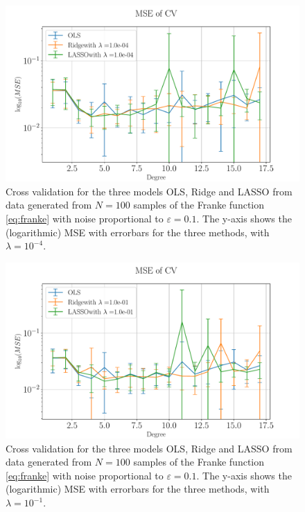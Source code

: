 \documentclass[%
reprint,
amsmath,amssymb,
aps,
pra,
]{revtex4-2}
\begin{document}
\begin{figure}[ht!]
	\centering
	\includegraphics[width=\linewidth]{Python/Figures/CV/CV_2_no_scaling.pdf}
	\caption{Cross validation for the three models OLS, Ridge and LASSO from data generated from \(N=100\) samples of the Franke function \eqref{eq:franke} with noise proportional to \(\varepsilon=0.1\). The y-axis shows the (logarithmic) MSE with errorbars for the three methods, with \(\lambda=10^{-4}\). }
	\label{fig:CV_2}
\end{figure}
\begin{figure}[ht!]
	\centering
	\includegraphics[width=\linewidth]{Python/Figures/CV/CV_3_no_scaling.pdf}
	\caption{Cross validation for the three models OLS, Ridge and LASSO from data generated from \(N=100\) samples of the Franke function \eqref{eq:franke} with noise proportional to \(\varepsilon=0.1\). The y-axis shows the (logarithmic) MSE with errorbars for the three methods, with \(\lambda=10^{-1}\). }
	\label{fig:CV_3}
\end{figure}
\end{document}
